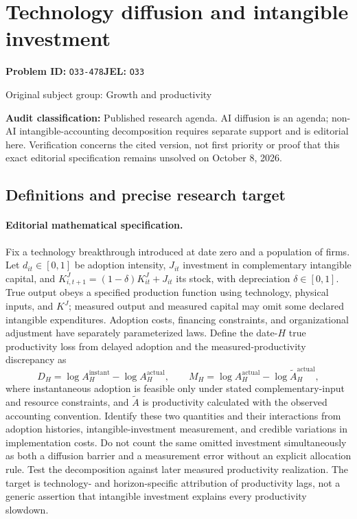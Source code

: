 \documentclass[11pt,a4paper]{article}
\begin{document}
\section*{Technology diffusion and intangible investment}
\textbf{Problem ID:} \texttt{O33-478}\quad \textbf{JEL:} \texttt{O33}\par
\label{problem:OP-0264}
{\sffamily\small\color{muted}Original subject group: Growth and productivity\par}
\label{definitions:problem:30007545}
\textbf{Audit classification:} Published research agenda. AI diffusion is an agenda; non-AI intangible-accounting decomposition requires separate support and is editorial here. Verification concerns the cited version, not first priority or proof that this exact editorial specification remains unsolved on October 8, 2026.
\subsection*{Definitions and precise research target}
\paragraph{Editorial mathematical specification.} Fix a technology breakthrough introduced at date zero and a population of firms. Let \(d_{it}\in[0,1]\) be adoption intensity, \(J_{it}\) investment in complementary intangible capital, and \(K^J_{i,t+1}=(1-\delta)K^J_{it}+J_{it}\) its stock, with depreciation \(\delta\in[0,1]\). True output obeys a specified production function using technology, physical inputs, and \(K^J\); measured output and measured capital may omit some declared intangible expenditures. Adoption costs, financing constraints, and organizational adjustment have separately parameterized laws.
Define the date-\(H\) true productivity loss from delayed adoption and the measured-productivity discrepancy as
\[
D_H=\log A_H^{\mathrm{instant}}-\log A_H^{\mathrm{actual}},\qquad
M_H=\log A_H^{\mathrm{actual}}-\log \widetilde A_H^{\mathrm{actual}},
\]
where instantaneous adoption is feasible only under stated complementary-input and resource constraints, and \(\widetilde A\) is productivity calculated with the observed accounting convention. Identify these two quantities and their interactions from adoption histories, intangible-investment measurement, and credible variations in implementation costs. Do not count the same omitted investment simultaneously as both a diffusion barrier and a measurement error without an explicit allocation rule. Test the decomposition against later measured productivity realization. The target is technology- and horizon-specific attribution of productivity lags, not a generic assertion that intangible investment explains every productivity slowdown.
\end{document}
